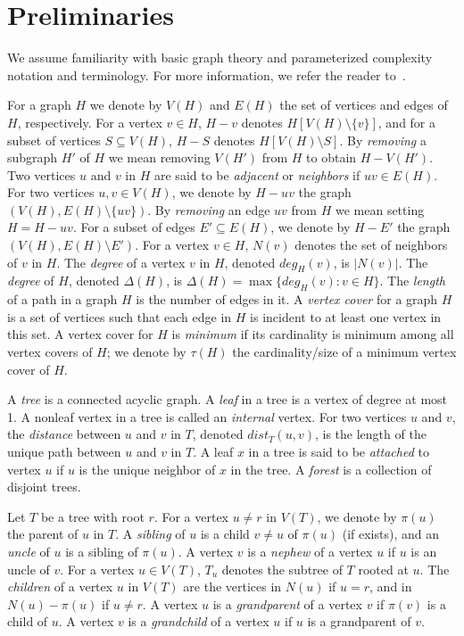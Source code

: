 \documentclass[11pt]{article}
\begin{document}
\section{Preliminaries}
\label{sec:prelim}
We assume familiarity with basic graph theory and parameterized complexity notation and terminology. For more information, we refer the reader to~\cite{fptbook,grohe,rolf,west}.

For a graph $H$ we denote by $V(H)$ and $E(H)$ the set of vertices and edges of $H$, respectively. For a vertex $v \in H$, $H-v$ denotes $H[V(H) \setminus \{v\}]$, and for a subset of vertices $S \subseteq V(H)$, $H-S$ denotes $H[V(H) \setminus S]$. By {\em removing} a subgraph $H'$ of $H$ we mean removing $V(H')$ from $H$ to obtain $H - V(H')$. Two vertices $u$ and $v$ in $H$ are said to be {\em adjacent} or {\em neighbors} if $uv \in E(H)$. For two vertices $u, v \in V(H)$, we denote by $H - uv$ the graph $(V(H), E(H) \setminus \{uv\})$. By {\em removing} an edge $uv$ from $H$ we mean setting $H = H -uv$. For a subset of edges $E' \subseteq E(H)$, we denote by $H-E'$ the graph $(V(H), E(H) \setminus E')$. For a vertex $v \in H$, $N(v)$ denotes the set of neighbors of $v$ in $H$. The {\em degree} of a vertex $v$ in $H$, denoted $deg_H(v)$, is $|N(v)|$. The {\em degree} of $H$, denoted $\Delta(H)$, is $\Delta(H) = \max\{deg_H(v): v \in H\}$. The {\em length} of a path in a graph $H$ is the number of edges in it.
A {\em vertex cover} for a graph $H$ is a set of vertices such that each edge in $H$ is incident to at least one vertex in this set. A vertex cover for $H$ is {\em minimum} if its cardinality is minimum among all vertex covers of $H$; we denote by $\tau(H)$ the cardinality/size of a minimum vertex cover of $H$.

A {\em tree} is a connected acyclic graph. A {\em leaf} in a tree is a vertex of degree at most 1. A nonleaf vertex in a tree is called an {\em internal} vertex. For two vertices $u$ and $v$, the {\em distance} between $u$ and $v$ in $T$, denoted $dist_T(u, v)$, is the length of the unique path between $u$ and $v$ in $T$. A leaf $x$ in a tree is said to be {\em attached} to vertex $u$ if $u$ is the unique neighbor of $x$ in the tree. A {\em forest} is a collection of disjoint trees.

Let $T$ be a tree with root $r$. For a vertex $u \neq r$ in $V(T)$, we denote by $\pi(u)$ the parent of $u$ in $T$. A {\em sibling} of $u$ is a child $v \neq u$ of $\pi(u)$ (if exists), and an {\em uncle} of $u$ is a sibling of $\pi(u)$. A vertex $v$ is a {\em nephew} of a vertex $u$ if $u$ is an uncle of $v$. For a vertex $u \in V(T)$, $T_u$ denotes the subtree of $T$ rooted at $u$. The {\em children} of a vertex $u$ in $V(T)$ are the vertices in $N(u)$ if $u = r$, and in $N(u) - \pi(u)$ if $u \neq r$. A vertex $u$ is a {\em grandparent} of a vertex $v$ if $\pi(v)$ is a child of $u$. A vertex $v$ is a {\em grandchild} of a vertex $u$ if $u$ is a grandparent of $v$.
\end{document}
